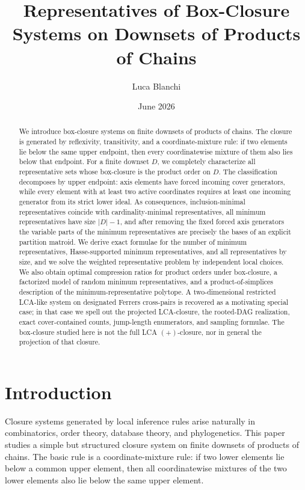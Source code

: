\documentclass[11pt]{article}
\begin{document}
\title{Representatives of Box-Closure Systems on Downsets of Products of Chains}
\author{Luca Blanchi}
\date{June 2026}

\maketitle

\begin{abstract}
We introduce box-closure systems on finite downsets of products of chains. The closure is generated by reflexivity, transitivity, and a coordinate-mixture rule: if two elements lie below the same upper endpoint, then every coordinatewise mixture of them also lies below that endpoint. For a finite downset $D$, we completely characterize all representative sets whose box-closure is the product order on $D$. The classification decomposes by upper endpoint: axis elements have forced incoming cover generators, while every element with at least two active coordinates requires at least one incoming generator from its strict lower ideal. As consequences, inclusion-minimal representatives coincide with cardinality-minimal representatives, all minimum representatives have size $|D|-1$, and after removing the fixed forced axis generators the variable parts of the minimum representatives are precisely the bases of an explicit partition matroid. We derive exact formulae for the number of minimum representatives, Hasse-supported minimum representatives, and all representatives by size, and we solve the weighted representative problem by independent local choices. We also obtain optimal compression ratios for product orders under box-closure, a factorized model of random minimum representatives, and a product-of-simplices description of the minimum-representative polytope. A two-dimensional restricted LCA-like system on designated Ferrers cross-pairs is recovered as a motivating special case; in that case we spell out the projected LCA-closure, the rooted-DAG realization, exact cover-contained counts, jump-length enumerators, and sampling formulae. The box-closure studied here is not the full LCA $(+)$-closure, nor in general the projection of that closure.
\end{abstract}

\section{Introduction}

Closure systems generated by local inference rules arise naturally in combinatorics, order theory, database theory, and phylogenetics. This paper studies a simple but structured closure system on finite downsets of products of chains. The basic rule is a coordinate-mixture rule: if two lower elements lie below a common upper element, then all coordinatewise mixtures of the two lower elements also lie below the same upper element.
\end{document}
